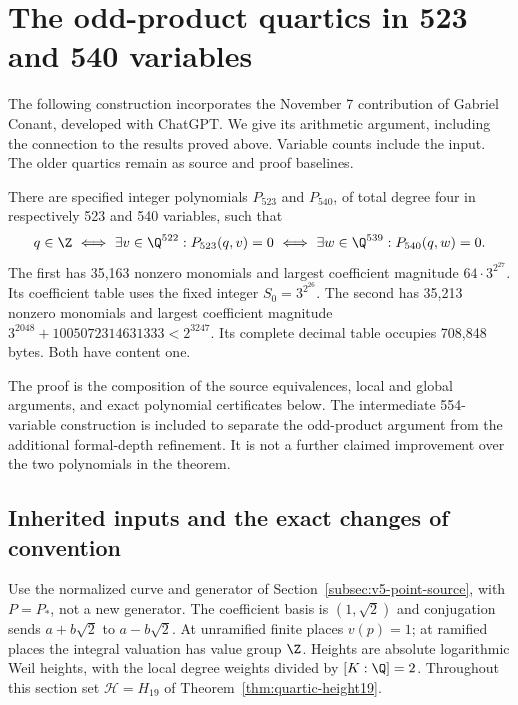 \section{The odd-product quartics in 523 and 540 variables}\label{sec:v9}

The following construction incorporates the November 7 contribution of
Gabriel Conant, developed with ChatGPT. We give its arithmetic argument,
including the connection to the results proved above. Variable counts
include the input. The older quartics remain as source and proof baselines.

\begin{theorem}\label{thm:v9-quartics}
There are specified integer polynomials $P_{523}$ and $P_{540}$, of total
degree four in respectively 523 and 540 variables, such that
\[
 q\in\Z\ \Longleftrightarrow\ \exists v\in\Q^{522}:P_{523}(q,v)=0
 \ \Longleftrightarrow\ \exists w\in\Q^{539}:P_{540}(q,w)=0.
\]
The first has 35,163 nonzero monomials and largest coefficient magnitude
$64\cdot3^{2^{27}}$. Its coefficient table uses the fixed integer
$S_0=3^{2^{26}}$. The second has 35,213 nonzero monomials and largest
coefficient magnitude $3^{2048}+1005072314631333<2^{3247}$.
Its complete decimal table occupies 708,848 bytes. Both have content one.
\end{theorem}

The proof is the composition of the source equivalences, local and global
arguments, and exact polynomial certificates below. The intermediate
554-variable construction is included to separate the odd-product
argument from the additional formal-depth refinement. It is not a further
claimed improvement over the two polynomials in the theorem.

\subsection{Inherited inputs and the exact changes of convention}\label{subsec:v9-inputs}

Use the normalized curve and generator of
Section~\ref{subsec:v5-point-source}, with $P=P_*$, not a new generator.
The coefficient basis is $(1,\sqrt2)$ and conjugation sends
$a+b\sqrt2$ to $a-b\sqrt2$. At unramified finite places $v(p)=1$;
at ramified places the integral valuation has value group $\Z$.
Heights are absolute logarithmic Weil heights, with the local degree
weights divided by $[K:\Q]=2$. Throughout this section set
$\mathcal H=H_{19}$ of Theorem~\ref{thm:quartic-height19}.

